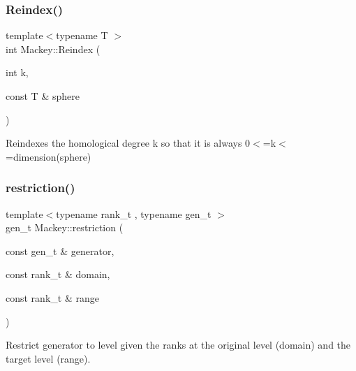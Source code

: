 \subsubsection{\texorpdfstring{Reindex()}{Reindex()}\hspace{0.1cm}{\footnotesize\ttfamily [2/2]}}
{\footnotesize\ttfamily template$<$typename T $>$ \\
int Mackey\+::\+Reindex (\begin{DoxyParamCaption}\item[{int}]{k,  }\item[{const T \&}]{sphere }\end{DoxyParamCaption})\hspace{0.3cm}{\ttfamily [inline]}}



Reindexes the homological degree k so that it is always 0$<$=k$<$=dimension(sphere) 

\mbox{\label{namespaceMackey_ad1e907ff76b07d4fc4c9d4bdf25918bd}} 
\subsubsection{\texorpdfstring{restriction()}{restriction()}\hspace{0.1cm}{\footnotesize\ttfamily [1/2]}}
{\footnotesize\ttfamily template$<$typename rank\+\_\+t , typename gen\+\_\+t $>$ \\
gen\+\_\+t Mackey\+::restriction (\begin{DoxyParamCaption}\item[{const gen\+\_\+t \&}]{generator,  }\item[{const rank\+\_\+t \&}]{domain,  }\item[{const rank\+\_\+t \&}]{range }\end{DoxyParamCaption})}



Restrict generator to level given the ranks at the original level (domain) and the target level (range). 

